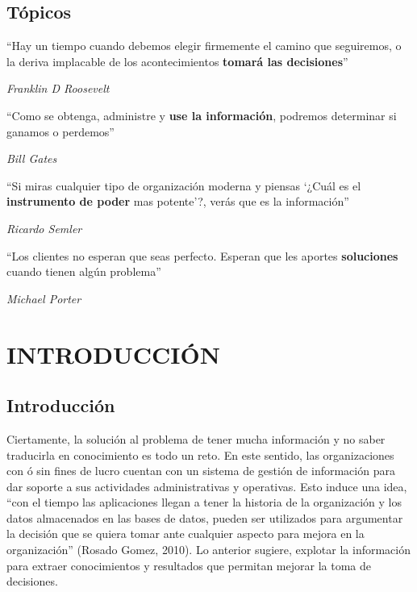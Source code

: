 \documentclass[11pt,titlepage]{report}
\begin{document}
\section*{Tópicos}
\begin{list}{}
\item “Hay un tiempo cuando debemos elegir firmemente el camino que seguiremos, o la deriva implacable de los acontecimientos \textbf{tomará las decisiones}”
\begin{flushright}
\textit{Franklin D Roosevelt}
\end{flushright}
	\vspace*{0.4cm}
	\item “Como se obtenga, administre y \textbf{use la
		información}, podremos determinar si
	ganamos o perdemos”
	\begin{flushright}
		\textit{Bill Gates}
	\end{flushright}
	\vspace*{0.4cm}
	\item “Si miras cualquier tipo de organización
	moderna y piensas ‘¿Cuál es el
	\textbf{instrumento de poder} mas potente’?,
	verás que es la información”
	\begin{flushright}
		\textit{Ricardo Semler}
	\end{flushright}
	\vspace*{0.4cm}
	\item “Los clientes no esperan que seas
	perfecto. Esperan que les aportes
	\textbf{soluciones} cuando tienen algún problema”
	\begin{flushright}
		\textit{Michael Porter}
	\end{flushright}
\end{list}
\pagebreak


\tableofcontents


\chapter{INTRODUCCIÓN}

\section{Introducción}
Ciertamente, la solución al problema de tener mucha información y no saber traducirla en conocimiento es todo un reto. En este sentido, las organizaciones con ó sin fines de lucro cuentan con un sistema de gestión de información para dar soporte a sus actividades administrativas y operativas. Esto induce una idea,  “con el tiempo las aplicaciones llegan a tener la historia de la organización y los datos almacenados en las bases de datos, pueden ser utilizados para argumentar la decisión que se quiera tomar ante cualquier aspecto para mejora en la organización” (Rosado Gomez, 2010). Lo anterior sugiere, explotar la información para extraer conocimientos y resultados que permitan mejorar la toma de decisiones.\\
\end{document}
